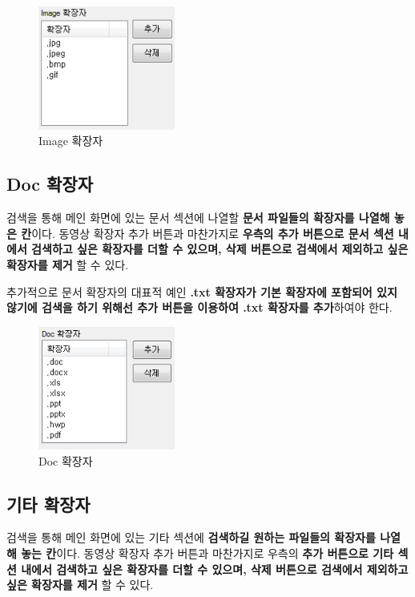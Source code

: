 \documentclass[a4paper, 13pt]{article} %
\begin{document}
		\begin{figure}[h]
			\centering
			\includegraphics[width=0.4\textwidth]{Figures/Image}
			\caption{Image 확장자}
			\label{fig:image}
		\end{figure}
	
		\newpage
		
		\subsection{Doc 확장자}		
		검색을 통해 메인 화면에 있는 문서 섹션에 나열할 \textbf{문서 파일들의 확장자를 나열해 놓은 칸}이다. 동영상 확장자 추가 버튼과 마찬가지로 \textbf{우측의 추가 버튼으로 문서 섹션 내에서 검색하고 싶은 확장자를 더할 수 있으며, 삭제 버튼으로 검색에서 제외하고 싶은 확장자를 제거} 할 수 있다.
		
		추가적으로 문서 확장자의 대표적 예인 \textbf{.txt 확장자가 기본 확장자에 포함되어 있지 않기에 검색을 하기 위해선 추가 버튼을 이용하여 .txt 확장자를 추가}하여야 한다.
		
		\begin{figure}[h]
			\centering
			\includegraphics[width=0.4\textwidth]{Figures/Doc}
			\caption{Doc 확장자}
			\label{fig:Doc}
		\end{figure}
	
		\subsection{기타 확장자}
		검색을 통해 메인 화면에 있는 기타 섹션에 \textbf{검색하길 원하는 파일들의 확장자를 나열해 놓는 칸}이다. 동영상 확장자 추가 버튼과 마찬가지로 우측의 \textbf{추가 버튼으로 기타 섹션 내에서 검색하고 싶은 확장자를 더할 수 있으며, 삭제 버튼으로 검색에서 제외하고 싶은 확장자를 제거} 할 수 있다.
		
\end{document}

